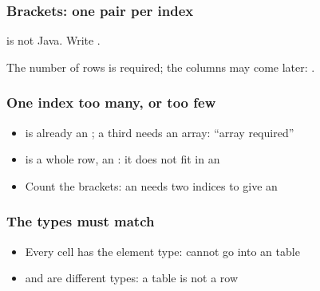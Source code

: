 \documentclass[aspectratio=169,10pt,compress]{beamer}
\begin{document}




\begin{frame}[t,fragile] \frametitle{Brackets: one pair per index}

	\footnotesize {} is not Java. Write .

	\vspace{0.4em}

	\footnotesize The number of rows is required; the columns may come later: .
\end{frame}




\begin{frame}[t,fragile] \frametitle{One index too many, or too few}

	\begin{itemize}\footnotesize
		\item {} is already an ; a third \hCode{[0]} needs an array: ``array required''
		\item {} is a whole row, an : it does not fit in an 
		\item Count the brackets: an  needs two indices to give an 
	\end{itemize}
\end{frame}




\begin{frame}[t,fragile] \frametitle{The types must match}

	\begin{itemize}\footnotesize
		\item Every cell has the element type:  cannot go into an  table
		\item {} and  are different types: a table is not a row
	\end{itemize}
\end{frame}
\end{document}
